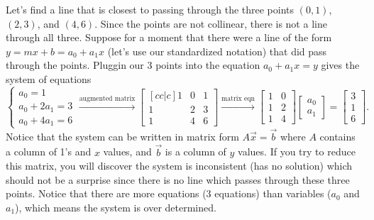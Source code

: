 \begin{example}\label{regression1ex}
Let's find a line that is closest to passing through the three points $(0,1)$, $(2,3)$, and $(4,6)$.  Since the points are not collinear, there is not a line through all three.  Suppose for a moment that there were a line of the form $y=mx+b=a_0+a_1x$ (let's use our standardized notation) that did pass through the points. Pluggin our 3 points into the equation $a_0+a_1x=y$ gives the system of equations 
$$\begin{cases}a_0=1\\a_0+2a_1=3\\a_0+4a_1=6\end{cases}
\xrightarrow{\text{augmented matrix}}
\begin{bmatrix}[cc|c]1&0&1\\1&2&3\\1&4&6\end{bmatrix}
\xrightarrow{\text{matrix eqn}}
\begin{bmatrix}1&0\\1&2\\1&4\end{bmatrix}
\begin{bmatrix}a_0\\a_1\end{bmatrix}
=\begin{bmatrix}3\\1\\6\end{bmatrix}.
$$
Notice that the system can be written in matrix form $A\vec x = \vec b$ where $A$ contains a column of 1's and $x$ values, and $\vec b$ is a column of $y$ values. 
If you try to reduce this matrix, you will discover the system is inconsistent (has no solution) which should not be a surprise since there is no line which passes through these three points. 
Notice that there are more equations (3 equations) than variables ($a_0$ and $a_1$), which means the system is over determined.


\end{example}
